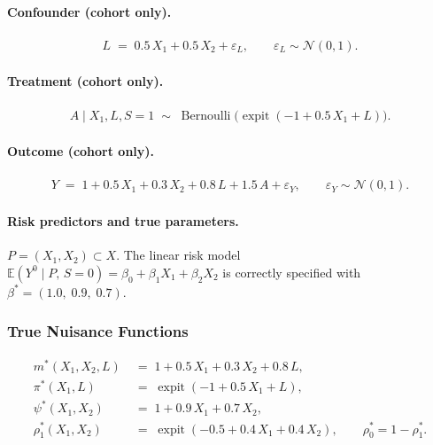 \paragraph{Confounder (cohort only).}
\begin{align}
  L \;=\; 0.5\,X_1 + 0.5\,X_2 + \varepsilon_L, \qquad
  \varepsilon_L \sim \mathcal{N}(0,1).
\end{align}

\paragraph{Treatment (cohort only).}
\begin{align}
  A \mid X_1, L, S=1 \;\sim\; \operatorname{Bernoulli}\!\bigl(
    \operatorname{expit}(-1 + 0.5\,X_1 + L)\bigr).
\end{align}

\paragraph{Outcome (cohort only).}
\begin{align}
  Y \;=\; 1 + 0.5\,X_1 + 0.3\,X_2 + 0.8\,L + 1.5\,A + \varepsilon_Y,
  \qquad \varepsilon_Y \sim \mathcal{N}(0,1).
\end{align}

\paragraph{Risk predictors and true parameters.}
$P = (X_1, X_2) \subset X$.  The linear risk model
$\mathbb{E}(Y^0 \mid P,\, S=0) = \beta_0 + \beta_1 X_1 + \beta_2 X_2$
is correctly specified with
$\beta^* = (1.0,\; 0.9,\; 0.7)$.

\subsubsection*{True Nuisance Functions}

\begin{align}
  m^*(X_1, X_2, L)
    &\;=\; 1 + 0.5\,X_1 + 0.3\,X_2 + 0.8\,L, \\[4pt]
  \pi^*(X_1, L)
    &\;=\; \operatorname{expit}(-1 + 0.5\,X_1 + L), \\[4pt]
  \psi^*(X_1, X_2)
    &\;=\; 1 + 0.9\,X_1 + 0.7\,X_2, \\[4pt]
  \rho_1^*(X_1, X_2)
    &\;=\; \operatorname{expit}(-0.5 + 0.4\,X_1 + 0.4\,X_2), \qquad
  \rho_0^* = 1 - \rho_1^*.
\end{align}

